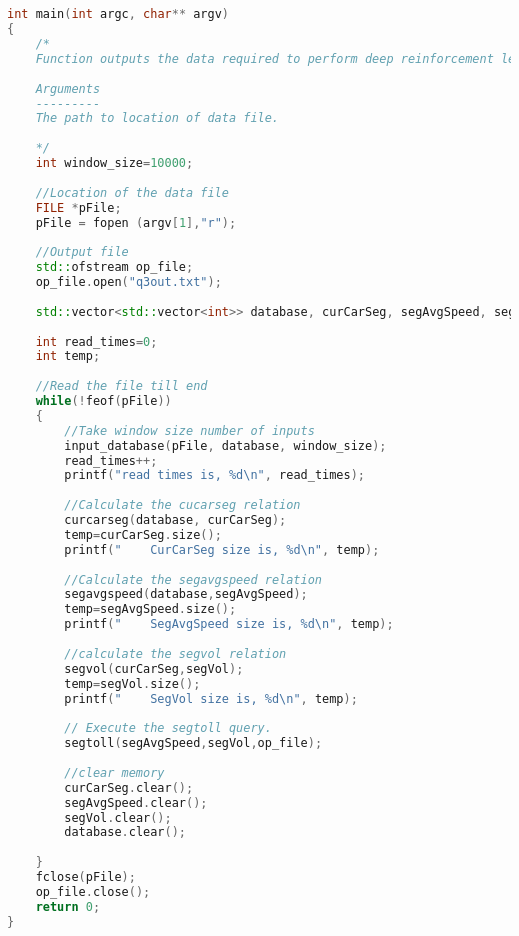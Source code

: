 \begin{lstlisting}[language=C++, caption=Code plan overview for complex query, label={lst:complex_query_overview}]


int main(int argc, char** argv)
{
    /*
    Function outputs the data required to perform deep reinforcement learning for query optimization
    
    Arguments
    ---------
    The path to location of data file.
    
    */
    int window_size=10000;
    
    //Location of the data file    
    FILE *pFile;
    pFile = fopen (argv[1],"r");
    
    //Output file
    std::ofstream op_file;
    op_file.open("q3out.txt");
    
    std::vector<std::vector<int>> database, curCarSeg, segAvgSpeed, segVol;
    
    int read_times=0;
    int temp;
    
    //Read the file till end
    while(!feof(pFile))
    {
        //Take window size number of inputs
        input_database(pFile, database, window_size);
        read_times++;
        printf("read times is, %d\n", read_times);
        
        //Calculate the cucarseg relation
        curcarseg(database, curCarSeg);
        temp=curCarSeg.size();
        printf("    CurCarSeg size is, %d\n", temp);
        
        //Calculate the segavgspeed relation
        segavgspeed(database,segAvgSpeed);
        temp=segAvgSpeed.size();
        printf("    SegAvgSpeed size is, %d\n", temp);
        
        //calculate the segvol relation
        segvol(curCarSeg,segVol);
        temp=segVol.size();
        printf("    SegVol size is, %d\n", temp);
        
        // Execute the segtoll query.
        segtoll(segAvgSpeed,segVol,op_file);
        
        //clear memory
        curCarSeg.clear();
        segAvgSpeed.clear();
        segVol.clear();
        database.clear();
        
    }
    fclose(pFile);
    op_file.close();
    return 0;
}
\end{lstlisting}

